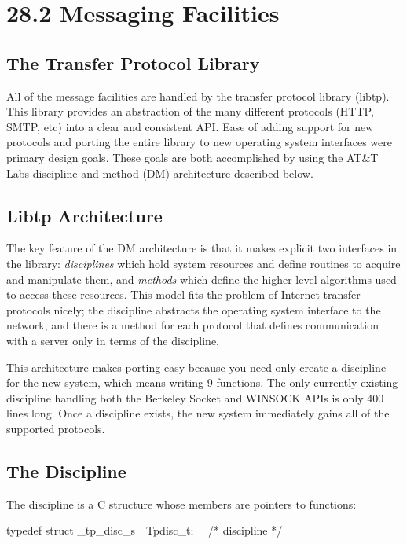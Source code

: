 \section[28.2 Messaging Facilities]{28.2 Messaging Facilities}
\subsection{The Transfer Protocol Library}

All of the message facilities are handled by the transfer protocol
library (libtp). This library provides an abstraction of the many
different protocols (HTTP, SMTP, etc) into a clear and consistent
API. Ease of adding support for new protocols and porting the entire
library to new operating system interfaces were primary design
goals. These goals are both accomplished by using the AT\&T Labs
discipline and method (DM) architecture described below.

\subsection{Libtp Architecture}

The key feature of the DM architecture is that it makes explicit two
interfaces in the library: \textit{disciplines} which hold system
resources and define routines to acquire and manipulate them, and
\textit{methods} which define the higher-level algorithms used to
access these resources. This model fits the problem of Internet
transfer protocols nicely; the discipline abstracts the operating
system interface to the network, and there is a method for each
protocol that defines communication with a server only in terms of the
discipline.

This architecture makes porting easy because you need only create a
discipline for the new system, which means writing 9 functions. The
only currently-existing discipline handling both the Berkeley Socket
and WINSOCK APIs is only 400 lines long. Once a discipline exists, the
new system immediately gains all of the supported protocols.

\subsection{The Discipline}

The discipline is a C structure whose members are pointers to functions:

\bigskip

{\ttfamily\mdseries
typedef struct \_tp\_disc\_s\ \ Tpdisc\_t; \ \ /* discipline */}


